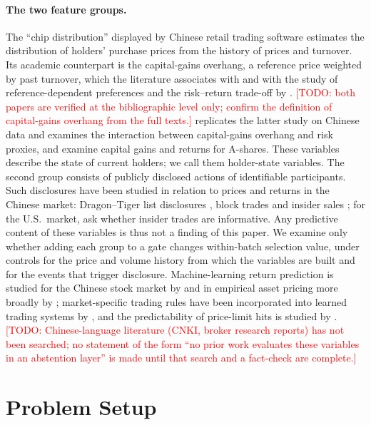 \documentclass[11pt]{article}
\theoremstyle{remark}
\newcommand{\todo}[1]{\textcolor{red}{[TODO: #1]}}
\begin{document}
\paragraph{The two feature groups.}
The ``chip distribution'' displayed by Chinese retail trading software estimates the
distribution of holders' purchase prices from the history of prices and turnover. Its academic
counterpart is the capital-gains overhang, a reference price weighted by past turnover, which
the literature associates with \citet{grinblatt2005prospect} and with the study of
reference-dependent preferences and the risk--return trade-off by \citet{wang2017reference}.
\todo{both papers are verified at the bibliographic level only; confirm the definition of
capital-gains overhang from the full texts.}
\citet{xu2025replication} replicates the latter study on Chinese data and examines the
interaction between capital-gains overhang and risk proxies, and \citet{pan2025overreaction}
examine capital gains and returns for A-shares. These variables describe the state of current
holders; we call them holder-state variables. The second group consists of publicly disclosed
actions of identifiable participants. Such disclosures have been studied in relation to prices
and returns in the Chinese market: Dragon--Tiger list disclosures \citep{hong2025dragontiger},
block trades \citep{fan2012block} and insider sales \citep{du2024fastsales}; for the U.S.\
market, \citet{lakonishok2001insider} ask whether insider trades are informative. Any
predictive content of these variables is thus not a finding of this paper. We examine only whether adding each group to a gate changes
within-batch selection value, under controls for the price and volume history from which the
variables are built and for the events that trigger disclosure. Machine-learning return
prediction is studied for the Chinese stock market by \citet{leippold2022machine} and in
empirical asset pricing more broadly by \citet{gu2020empirical}; market-specific trading rules have been incorporated into learned
trading systems by \citet{zhang2022t1}, and the predictability of price-limit hits is studied by
\citet{liang2024pricelimit}.
\todo{Chinese-language literature (CNKI, broker research reports) has not been searched; no
statement of the form ``no prior work evaluates these variables in an abstention layer'' is made
until that search and a fact-check are complete.}

\section{Problem Setup}
\label{sec:setup}
\end{document}
